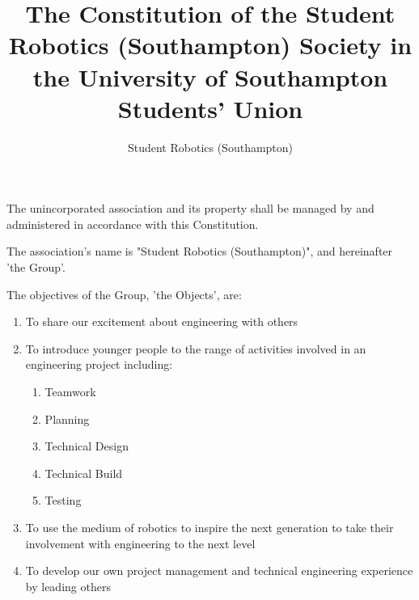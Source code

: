 \documentclass[12pt]{constitution}
\begin{document}

\title{The Constitution of the Student Robotics (Southampton) Society in the University of Southampton Students' Union}
\author{Student Robotics (Southampton)}
\maketitle



The unincorporated association and its property shall be managed by and administered in accordance with this Constitution.



The association's name is "Student Robotics (Southampton)", and hereinafter 'the Group'.



The objectives of the Group, 'the Objects', are:

\begin{enumerate}
    \item To share our excitement about engineering with others
    \item To introduce younger people to the range of activities involved in an engineering project including:
    \begin{enumerate}
        \item Teamwork
        \item Planning
        \item Technical Design 
        \item Technical Build
        \item Testing
    \end{enumerate}
    \item To use the medium of robotics to inspire the next generation to take their involvement with engineering to the next level
    \item To develop our own project management and technical engineering experience by leading others
\end{enumerate}


\end{document}
